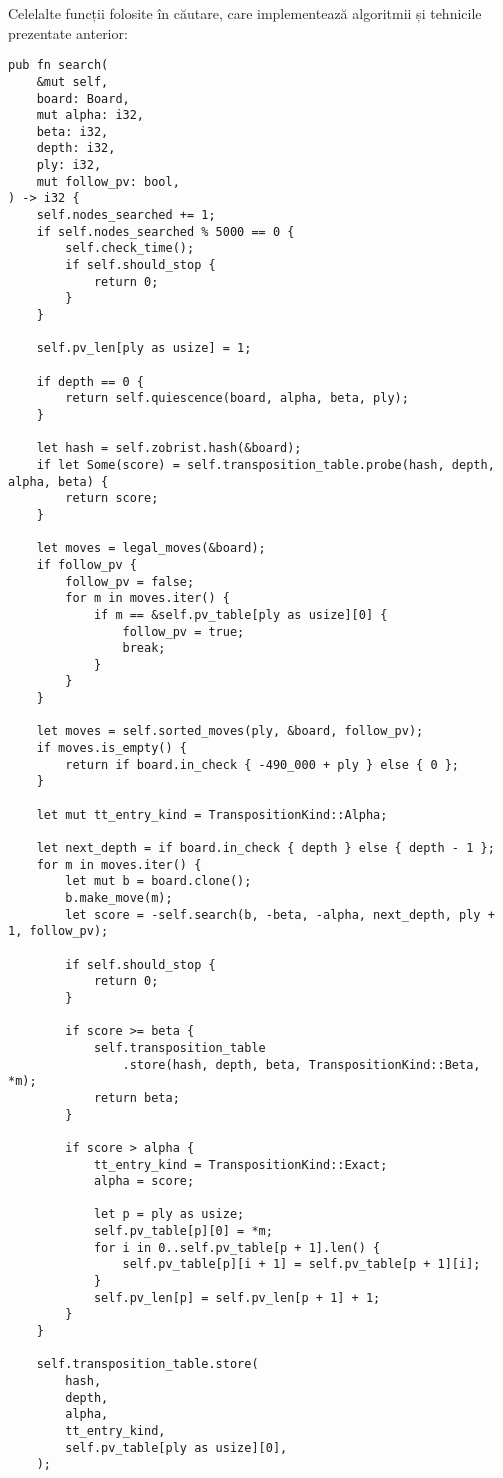 Celelalte funcții folosite în căutare, care implementează algoritmii și tehnicile prezentate
anterior:
\begin{lstlisting}[language=RustHtml]
pub fn search(
    &mut self,
    board: Board,
    mut alpha: i32,
    beta: i32,
    depth: i32,
    ply: i32,
    mut follow_pv: bool,
) -> i32 {
    self.nodes_searched += 1;
    if self.nodes_searched % 5000 == 0 {
        self.check_time();
        if self.should_stop {
            return 0;
        }
    }

    self.pv_len[ply as usize] = 1;

    if depth == 0 {
        return self.quiescence(board, alpha, beta, ply);
    }

    let hash = self.zobrist.hash(&board);
    if let Some(score) = self.transposition_table.probe(hash, depth, alpha, beta) {
        return score;
    }

    let moves = legal_moves(&board);
    if follow_pv {
        follow_pv = false;
        for m in moves.iter() {
            if m == &self.pv_table[ply as usize][0] {
                follow_pv = true;
                break;
            }
        }
    }

    let moves = self.sorted_moves(ply, &board, follow_pv);
    if moves.is_empty() {
        return if board.in_check { -490_000 + ply } else { 0 };
    }

    let mut tt_entry_kind = TranspositionKind::Alpha;

    let next_depth = if board.in_check { depth } else { depth - 1 };
    for m in moves.iter() {
        let mut b = board.clone();
        b.make_move(m);
        let score = -self.search(b, -beta, -alpha, next_depth, ply + 1, follow_pv);

        if self.should_stop {
            return 0;
        }

        if score >= beta {
            self.transposition_table
                .store(hash, depth, beta, TranspositionKind::Beta, *m);
            return beta;
        }

        if score > alpha {
            tt_entry_kind = TranspositionKind::Exact;
            alpha = score;

            let p = ply as usize;
            self.pv_table[p][0] = *m;
            for i in 0..self.pv_table[p + 1].len() {
                self.pv_table[p][i + 1] = self.pv_table[p + 1][i];
            }
            self.pv_len[p] = self.pv_len[p + 1] + 1;
        }
    }

    self.transposition_table.store(
        hash,
        depth,
        alpha,
        tt_entry_kind,
        self.pv_table[ply as usize][0],
    );


\end{lstlisting}
